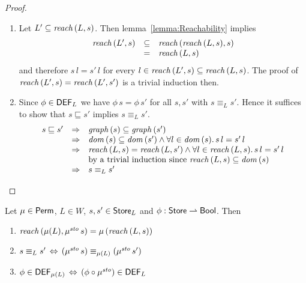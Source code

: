 \documentclass[12pt,a4paper]{report}
\newcommand{\ssto}{\nstyle{sto}}
\newcommand{\DEF}{\sstyle{DEF}}
\begin{document}
\begin{proof} \
  \begin{enumerate}
    \item Let $L' \subseteq \mathit{reach}\,(L,s)$. Then lemma~\ref{lemma:Reachability} implies
          \[\begin{array}{rcl}
            \mathit{reach}\,(L',s) &\subseteq& \mathit{reach}\,(\mathit{reach}\,(L,s),s) \\
                          &=&         \mathit{reach}\,(L,s)
          \end{array}\]
          and therefore $s\,l = s'\,l$ for every $l \in \mathit{reach}\,(L',s) \subseteq \mathit{reach}\,(L,s)$. The
          proof of $\mathit{reach}\,(L',s) = \mathit{reach}\,(L',s')$ is a trivial induction then.

    \item Since $\phi \in \DEF_L$ we have $\phi\,s = \phi\,s'$ for all $s,s'$ with $s \equiv_L s'$. Hence
          it suffices to show that $s \sqsubseteq s'$ implies $s \equiv_L s'$.
          \[\begin{array}{rcl}
            s \sqsubseteq s'
            &\Rightarrow& \mathit{graph}\,(s) \subseteq \mathit{graph}\,(s') \\
            &\Rightarrow& \mathit{dom}\,(s) \subseteq \mathit{dom}\,(s') \wedge \forall l\in\mathit{dom}\,(s).\,s\,l = s'\,l \\
            &\Rightarrow& \mathit{reach}\,(L,s) = \mathit{reach}\,(L,s') \wedge \forall l\in\mathit{reach}\,(L,s).\,s\,l = s'\,l \\
            &           & \text{by a trivial induction since $\mathit{reach}\,(L,s) \subseteq \mathit{dom}\,(s)$} \\
            &\Rightarrow& s \equiv_L s'
          \end{array}\]
  \end{enumerate}
\end{proof}

\begin{lemma} \label{lemma:Permutations_and_Reachability}
  Let $\mu \in \mathsf{Perm}$, $L \in W$, $s,s'\in\mathsf{Store}_L$ and $\phi:\mathsf{Store}\rightharpoonup\mathsf{Bool}$.
  Then
  \begin{enumerate}
    \item $\reach{\mu(L)}{\mu^\ssto\,s} = \mu\,(\reach{L}{s})$
    \item $s \equiv_L s' \,\Leftrightarrow\, (\mu^\ssto\,s) \equiv_{\mu(L)} (\mu^\ssto\,s')$
    \item $\phi \in \DEF_{\mu(L)} \,\Leftrightarrow\, (\phi \circ \mu^\ssto) \in \DEF_L$
  \end{enumerate}
\end{lemma}
\end{document}
